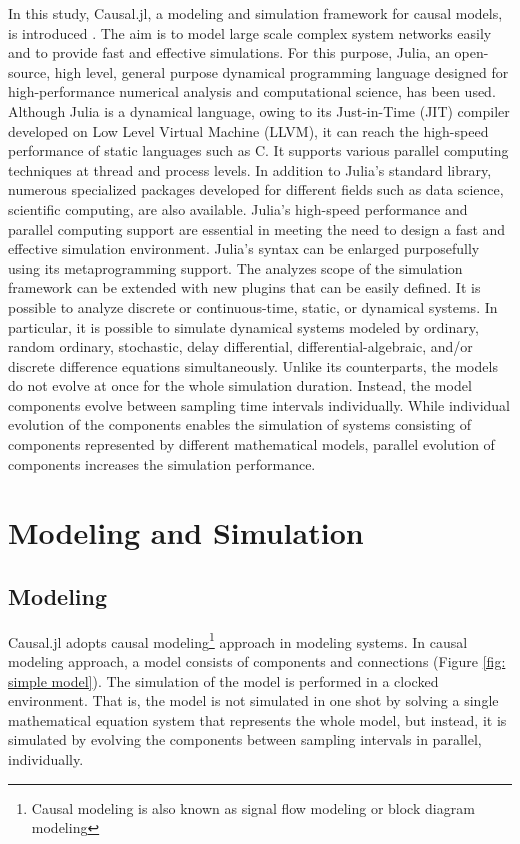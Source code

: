 \documentclass{juliacon}
\begin{document}
In this study, Causal.jl, a modeling and simulation framework for causal models, is introduced \cite{causal}. The aim is to model large scale complex system networks easily and to provide fast and effective simulations. For this purpose, Julia, an open-source, high level, general purpose dynamical programming language designed for high-performance numerical analysis and computational science, has been used. Although Julia is a dynamical language, owing to its Just-in-Time (JIT) compiler developed on Low Level Virtual Machine (LLVM), it can reach the high-speed performance of static languages such as C\cite{bezanson2017julia,julialang}. It supports various parallel computing techniques at thread and process levels. In addition to Julia's standard library, numerous specialized packages developed for different fields such as data science, scientific computing, are also available. Julia's high-speed performance and parallel computing support are essential in meeting the need to design a  fast and effective simulation environment. Julia's syntax can be enlarged purposefully using its metaprogramming support. The analyzes scope of the simulation framework can be extended with new plugins that can be easily defined. It is possible to analyze discrete or continuous-time, static, or dynamical systems. In particular, it is possible to simulate dynamical systems modeled by ordinary, random ordinary, stochastic, delay differential, differential-algebraic, and/or discrete difference equations simultaneously. Unlike its counterparts, the models do not evolve at once for the whole simulation duration. Instead, the model components evolve between sampling time intervals individually. While individual evolution of the components enables the simulation of systems consisting of components represented by different mathematical models, parallel evolution of components increases the simulation performance.




\section{Modeling and Simulation}

\subsection{Modeling}
Causal.jl adopts causal modeling\footnote{Causal modeling is also known as signal flow modeling or block diagram modeling} approach in modeling systems. In causal modeling approach, a model consists of components and connections (Figure \ref{fig: simple model})\cite{matei2012modeling}. The simulation of the model is performed in a clocked environment. That is, the model is not simulated in one shot by solving a single mathematical equation system that represents the whole model, but instead, it is simulated by evolving the components between sampling intervals in parallel, individually.
\end{document}
